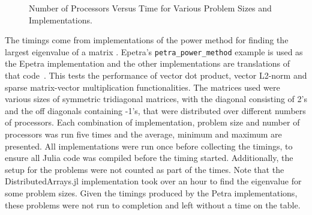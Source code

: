 \documentclass[acmsmall]{acmart}
\begin{document}
	\begin{figure}
		\caption{Number of Processors Versus Time for Various Problem Sizes and Implementations.}
		\label{fig:result-numproc}
	\end{figure}
	
	The timings come from implementations of the power method for finding the largest eigenvalue of a matrix
	\cite{Gu:2000:PowerMethod}.
	Epetra's \texttt{petra\_power\_method} example is used as the Epetra implementation and the other implementations are translations of that code~\cite{Heroux:2005:Trilinos}.
	This tests the performance of vector dot product, vector L2-norm and sparse matrix-vector multiplication functionalities.
	The matrices used were various sizes of symmetric tridiagonal matrices, with the diagonal consisting of 2's
	and the off diagonals containing -1's, that were distributed over different numbers of processors.
	Each combination of implementation, problem size and number of processors was run five times
	and the average, minimum and maximum are presented.
	All implementations were run once before collecting the timings, to ensure all Julia code was
	compiled before the timing started.
	Additionally, the setup for the problems were not counted as part of the times.
	Note that the DistributedArrays.jl implementation took over an hour to find the eigenvalue for some problem sizes.
	Given the timings produced by the Petra implementations, these problems were not run to completion and left without a time on the table.
	
\end{document}
